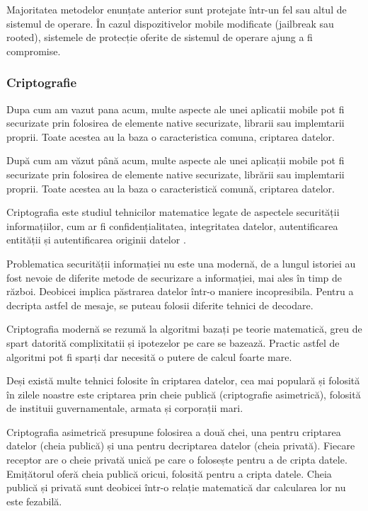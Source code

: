 \documentclass[12pt]{article}
\begin{document}
Majoritatea metodelor enunțate anterior sunt protejate într-un fel sau altul
de sistemul de operare. În cazul dispozitivelor mobile modificate (jailbreak sau rooted), 
sistemele de protecție oferite de sistemul de operare ajung a fi compromise.

\subsubsection{Criptografie}

Dupa cum am vazut pana acum, multe aspecte ale unei aplicatii mobile pot fi securizate
prin folosirea de elemente native securizate, librarii sau implemtarii proprii. Toate acestea
au la baza o caracteristica comuna, criptarea datelor.

\bigskip

După cum am văzut până acum, multe aspecte ale unei aplicații mobile pot fi securizate
prin folosirea de elemente native securizate, librării sau implemtarii proprii. Toate acestea
au la baza o caracteristică comună, criptarea datelor.

\bigskip

Criptografia este studiul tehnicilor matematice legate de aspectele 
securității informațiilor, cum ar fi confidențialitatea, integritatea datelor, 
autentificarea entității și autentificarea originii datelor \cite{katz1996handbook}.

Problematica securității informației nu este una modernă, de a lungul istoriei 
au fost nevoie de diferite metode de securizare a informației, mai ales în timp de război.
Deobicei implica păstrarea datelor într-o maniere incopresibila. Pentru a decripta
astfel de mesaje, se puteau folosii diferite tehnici de decodare.

Criptografia modernă se rezumă la algoritmi bazați pe teorie matematică, greu 
de spart datorită complixitatii și ipotezelor pe care se bazează. Practic astfel de
algoritmi pot fi sparți dar necesită o putere de calcul foarte mare.

Deși există multe tehnici folosite în criptarea datelor, cea mai populară și folosită
în zilele noastre este criptarea prin cheie publică (criptografie asimetrică), folosită
de instituii guvernamentale, armata și corporații mari.


Criptografia asimetrică presupune folosirea a două chei, una pentru criptarea datelor
(cheia publică) și una pentru decriptarea datelor (cheia privată). Fiecare receptor are o cheie privată unică pe care o folosește pentru a de cripta datele.
Emițătorul oferă cheia publică oricui, folosită pentru a cripta datele. Cheia publică și privată sunt deobicei într-o relație matematică dar calcularea lor
nu este fezabilă.
\end{document}
